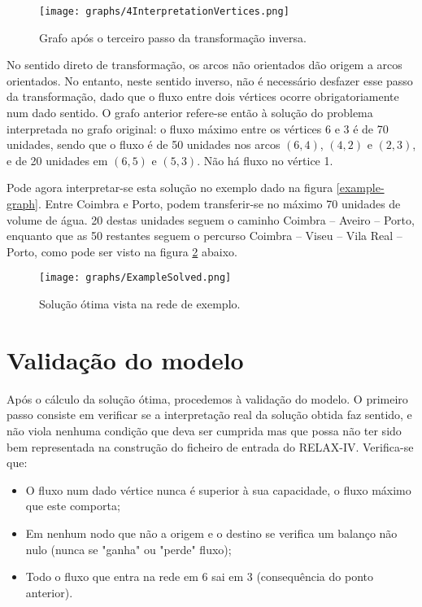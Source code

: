 \documentclass[12pt, a4paper, titlepage]{article}
\begin{document}
\begin{figure}[H]
    \centering
    \texttt{[image: graphs/4InterpretationVertices.png]}
    \caption{Grafo após o terceiro passo da transformação inversa.}
    \label{4interpretation-graph}
\end{figure}

No sentido direto de transformação, os arcos não orientados dão origem a arcos orientados. No
entanto, neste sentido inverso, não é necessário desfazer esse passo da transformação, dado que o
fluxo entre dois vértices ocorre obrigatoriamente num dado sentido. O grafo anterior refere-se então
à solução do problema interpretada no grafo original: o fluxo máximo entre os vértices 6 e 3 é de 70
unidades, sendo que o fluxo é de 50 unidades nos arcos $(6, 4)$, $(4, 2)$ e $(2, 3)$, e de 20
unidades em $(6, 5)$ e $(5, 3)$. Não há fluxo no vértice 1.

Pode agora interpretar-se esta solução no exemplo dado na figura \ref{example-graph}. Entre Coimbra
e Porto, podem transferir-se no máximo 70 unidades de volume de água. 20 destas unidades seguem o
caminho Coimbra -- Aveiro -- Porto, enquanto que as 50 restantes seguem o percurso Coimbra -- Viseu
-- Vila Real -- Porto, como pode ser visto na figura \ref{example-solved} abaixo.

\begin{figure}[H]
    \centering
    \texttt{[image: graphs/ExampleSolved.png]}
    \caption{Solução ótima vista na rede de exemplo.}
    \label{example-solved}
\end{figure}

\section{Validação do modelo}

Após o cálculo da solução ótima, procedemos à validação do modelo. O primeiro passo consiste em
verificar se a interpretação real da solução obtida faz sentido, e não viola nenhuma condição que
deva ser cumprida mas que possa não ter sido bem representada na construção do ficheiro de entrada
do RELAX-IV. Verifica-se que:

\begin{itemize}
    \item O fluxo num dado vértice nunca é superior à sua capacidade, o fluxo máximo que este
        comporta;
    \item Em nenhum nodo que não a origem e o destino se verifica um balanço não nulo (nunca se
        "ganha"{} ou "perde"{} fluxo);
    \item Todo o fluxo que entra na rede em 6 sai em 3 (consequência do ponto anterior).
\end{itemize}
\end{document}
